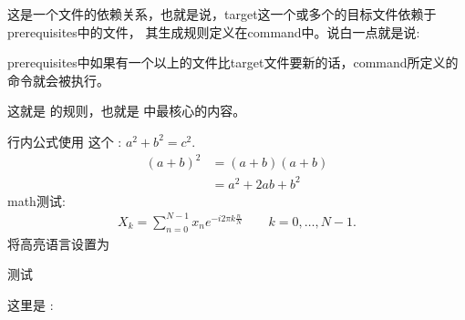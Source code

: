 \documentclass[letterpaper,10pt,english]{sphinxmanual}
\begin{document}
这是一个文件的依赖关系，也就是说，target这一个或多个的目标文件依赖于prerequisites中的文件，
其生成规则定义在command中。说白一点就是说:

%
\begin{sphinxVerbatim}[commandchars=\\\{\}]
prerequisites中如果有一个以上的文件比target文件要新的话，command所定义的命令就会被执行。
\end{sphinxVerbatim}

这就是  的规则，也就是  中最核心的内容。


行内公式使用  这个 : \(a^2 + b^2 = c^2\).
\begin{equation*}
\begin{split}(a + b)^2  &=  (a + b)(a + b) \\
           &=  a^2 + 2ab + b^2\end{split}
\end{equation*}
 math测试:
\begin{equation*}
\begin{split}X_k =  \sum_{n=0}^{N-1} x_n e^{-{i 2\pi k \frac{n}{N}}} \qquad k = 0,\dots,N-1.\end{split}
\end{equation*}
将高亮语言设置为 

测试 

%
\begin{sphinxVerbatim}[commandchars=\\\{\},numbers=left,firstnumber=1,stepnumber=1]
   
   
 
\end{sphinxVerbatim}

这里是  :

%
\begin{sphinxVerbatim}[commandchars=\\\{\},numbers=left,firstnumber=1,stepnumber=1]
 
   
   
      
        
   
\end{sphinxVerbatim}
\end{document}
